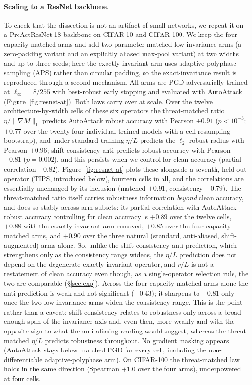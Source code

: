 \documentclass{article}
\theoremstyle{definition}
\begin{document}
\paragraph{Scaling to a ResNet backbone.} To check that the dissection is not an artifact of small networks, we repeat it on a PreActResNet-18 backbone on CIFAR-10 and CIFAR-100. We keep the four capacity-matched arms and add two parameter-matched low-invariance arms (a zero-padding variant and an explicitly aliased max-pool variant) at two widths and up to three seeds; here the exactly invariant arm uses adaptive polyphase sampling (APS) \citep{chaman2021truly} rather than circular padding, so the exact-invariance result is reproduced through a second mechanism. All arms are PGD-adversarially trained at $\ell_\infty{=}8/255$ with best-robust early stopping \citep{rice2020overfitting} and evaluated with AutoAttack (Figure~\ref{fig:resnet-at}). Both laws carry over at scale. Over the twelve architecture-by-width cells of these six operators the threat-matched ratio $\eta/\|\nabla M\|_1$ predicts AutoAttack robust accuracy with Pearson $+0.91$ ($p<10^{-3}$; $+0.77$ over the twenty-four individual trained models with a cell-resampling bootstrap), and under standard training $\eta/L$ predicts the $\ell_2$ robust radius with Pearson $+0.96$; shift-consistency anti-predicts robust accuracy with Pearson $-0.81$ ($p=0.002$), and this persists when we control for clean accuracy (partial correlation $-0.82$). Figure~\ref{fig:resnet-at} plots these alongside a seventh, held-out operator (TIPS, introduced below), fourteen cells in all, and the correlations are essentially unchanged by its inclusion (matched $+0.91$, consistency $-0.79$). The threat-matched ratio itself carries robustness information \emph{beyond} clean accuracy, and does so stably across arm subsets: its partial correlation with AutoAttack robust accuracy controlling for clean accuracy is $+0.89$ over the twelve cells, $+0.88$ with the exactly invariant arm removed, $+0.85$ over the four capacity-matched arms, and $+0.90$ over the three natural (standard, anti-aliased, shift-augmented) arms alone. So, unlike the shift-consistency anti-prediction, which strengthens only as the consistency range widens, the $\eta/L$ prediction does not depend on the degenerate exactly invariant operator, and $\eta/L$ is not a restatement of clean accuracy even though, as a single-operator selection rule, the two are comparable (\S\ref{sec:exp}). Across the four capacity-matched arms alone the anti-prediction is weak and not significant ($-0.43$); it sharpens to $-0.81$ only once the two low-invariance arms widen the consistency range. This is the point rather than a caveat: shift-consistency relates to robustness only across a broad enough span of the invariance axis and, even then, more weakly and with the opposite sign to what the anti-aliasing reading would suggest, whereas the threat-matched $\eta/L$ predicts robustness throughout. No gradient masking appears (AutoAttack stays below matched PGD for every cell, including the non-differentiable adaptive-polyphase arm). On CIFAR-100 the threat-matched law holds in the same direction (Spearman $+1.0$ over the four arms), underpowered at four cells.
\end{document}
